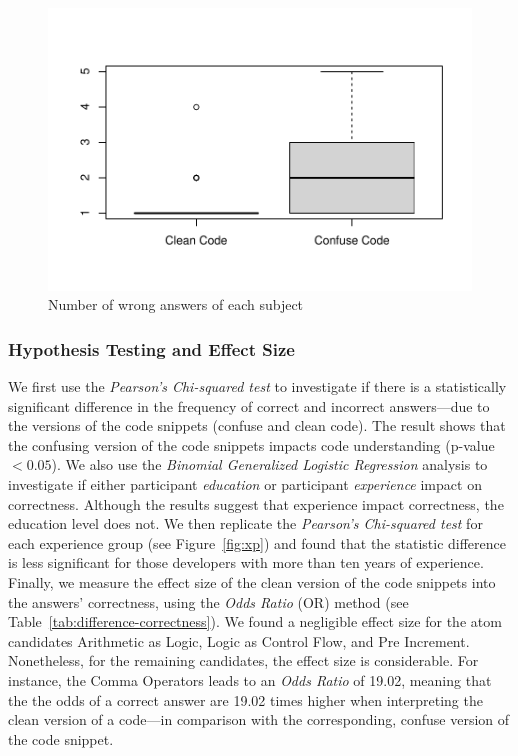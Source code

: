 \begin{figure}[htb!]
\noindent
 \centering
 \includegraphics[width=\columnwidth]{images/wrong-answers-plot-1.pdf}
 \caption{Number of wrong answers of each subject}
 \label{fig:boxplotcorrectness}
 \end{figure}


\subsubsection*{Hypothesis Testing and Effect Size}

We first use the \emph{Pearson's Chi-squared test}
to investigate if there is a statistically significant difference
in the frequency of correct and incorrect answers---due to the versions
of the code snippets (confuse and clean code). The result shows that the confusing version of the code snippets impacts code understanding (p-value $< 0.05$). We also use the \emph{Binomial Generalized Logistic Regression} analysis to investigate if either participant
\emph{education} or participant \emph{experience} impact on correctness. Although the results suggest that experience impact correctness, the education level does not. We then replicate the \emph{Pearson's Chi-squared test} for each experience group (see Figure~\ref{fig:xp}) and found that the statistic difference is less significant for those developers with more than ten years of experience.
Finally, we measure the effect size of the clean version of the code snippets into the answers' correctness, using the \emph{Odds Ratio} (OR)
method (see Table~\ref{tab:difference-correctness}). We found a negligible effect size for the atom candidates Arithmetic as Logic, Logic as Control Flow, and Pre Increment. Nonetheless, for the remaining candidates, the effect size is considerable. For instance, the Comma Operators leads to an \emph{Odds Ratio} of
\num{19.02}, meaning that the the odds of a correct answer are \num{19.02} times
higher when interpreting the clean version of a code---in comparison with the corresponding, confuse version of the code snippet.



